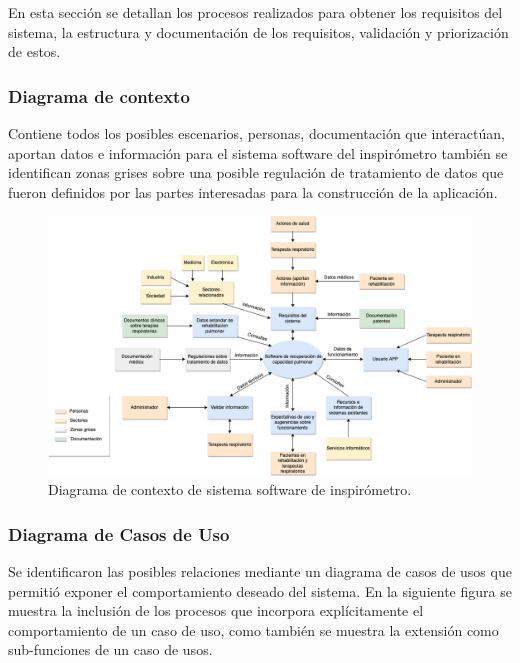 \documentclass[12pt]{article}
\begin{document}
En esta sección se detallan los procesos realizados para obtener los requisitos del sistema, la estructura y documentación de los requisitos, validación y priorización de estos.

\subsubsection{Diagrama de contexto} %

Contiene todos los posibles escenarios, personas, documentación que interactúan, aportan datos e información para el sistema software del inspirómetro también se identifican zonas grises sobre una posible regulación de tratamiento de datos que fueron definidos por las partes interesadas para la construcción de la aplicación.

\begin{figure}[ht]
\centering
\includegraphics[scale=0.40]{imag/C4-Diagram contexto.drawio.png}
\caption{Diagrama de contexto de sistema software de inspirómetro. }
\label{4}
\end{figure}
\FloatBarrier

\newpage

\subsubsection{Diagrama de Casos de Uso} %

Se identificaron las posibles relaciones mediante un diagrama de casos de usos que permitió exponer el comportamiento deseado del sistema. En la siguiente figura se muestra la inclusión de los procesos que incorpora explícitamente el comportamiento de un caso de uso, como también se muestra la extensión como sub-funciones de un caso de usos.
\end{document}
